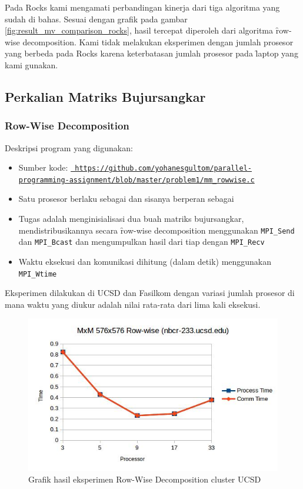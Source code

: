 Pada \cluster Rocks kami mengamati perbandingan kinerja dari tiga algoritma yang sudah di bahas. Sesuai dengan grafik pada gambar \ref{fig:result_mv_comparison_rocks}, hasil tercepat diperoleh dari algoritma \f{row-wise decomposition}. Kami tidak melakukan eksperimen dengan jumlah prosesor yang berbeda pada \cluster Rocks karena keterbatasan jumlah prosesor pada \f{laptop} yang kami gunakan.

\subsection{Perkalian Matriks Bujursangkar} 

\subsubsection{Row-Wise Decomposition}

Deskripsi program yang digunakan:
\begin{itemize}
	\item Sumber kode: \texttt{\url{ https://github.com/yohanesgultom/parallel-programming-assignment/blob/master/problem1/mm_rowwise.c}}
	\item Satu prosesor berlaku sebagai \manager dan sisanya berperan sebagai \worker 
	\item Tugas \manager adalah menginisialisasi dua buah matriks bujursangkar, mendistribusikannya secara \f{row-wise decomposition} menggunakan \verb|MPI_Send| dan \verb|MPI_Bcast| dan mengumpulkan hasil dari tiap \worker dengan \verb|MPI_Recv|	
	\item Waktu eksekusi dan komunikasi dihitung (dalam detik) menggunakan \verb|MPI_Wtime|
\end{itemize}

Eksperimen dilakukan di \cluster UCSD dan Fasilkom dengan variasi jumlah prosesor di mana waktu yang diukur adalah nilai rata-rata dari lima kali eksekusi.

\begin{figure}
	\centering
	\includegraphics[width=1\textwidth]
	{pics/chart_mm_rowwise_nbcr}
	\caption{Grafik hasil eksperimen Row-Wise Decomposition cluster UCSD}
	\label{fig:result_mm_rowwise_nbcr}
\end{figure}  

